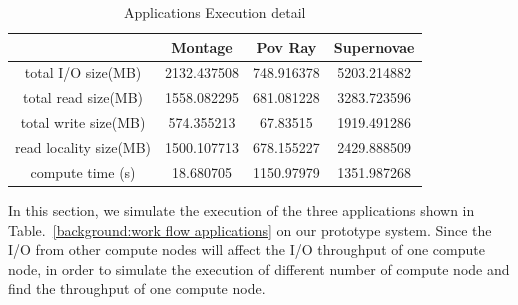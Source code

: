 \begin{table}
\centering
\begin{tabular}{|c|c|c|c|}
\hline
						&	Montage		&		Pov Ray		&		Supernovae		\\\hline
total I/O size(MB)		&	2132.437508	&		748.916378	&		5203.214882		\\\hline
total read size(MB)		&	1558.082295	&		681.081228	&		3283.723596		\\\hline
total write size(MB)	&	574.355213	&		67.83515	&		1919.491286		\\\hline
read locality size(MB)	&	1500.107713	&		678.155227	&		2429.888509		\\\hline
compute time (s)		&	18.680705	&		1150.97979	&		1351.987268		\\
\hline
\end{tabular}
\caption{Applications Execution detail}
\label{evaluation:application execution detail}
\end{table}


 In this section, we simulate the execution of the three applications shown in
 Table.~\ref{background:work flow applications} on our prototype system.
 Since the I/O from other compute nodes will affect the I/O throughput of one compute node,
 in order to simulate the execution of different number of compute node and find the throughput of
 one compute node.
% 
% 
% 


